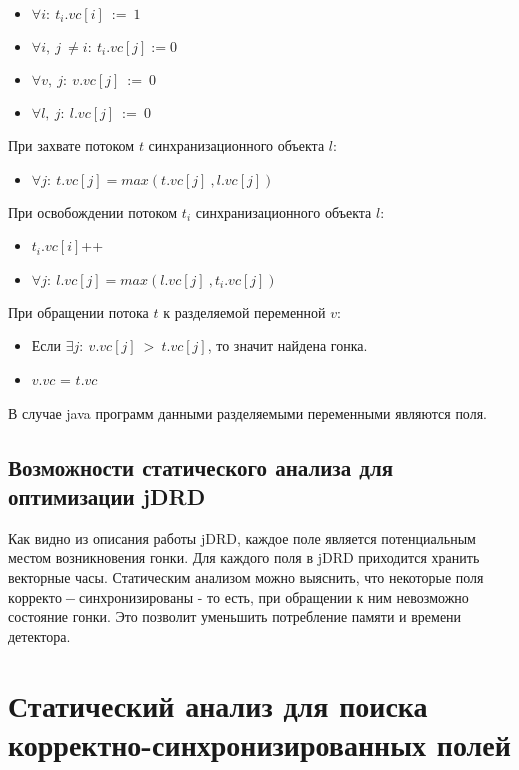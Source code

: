 \begin{itemize}
	\item $ \forall i:\ t_i.vc[i]\ :=\ 1$
	\item $ \forall i,\ j\ \neq i:\ t_i.vc[j] := 0$
	\item $ \forall v,\ j:\  v.vc[j]\ :=\ 0$
	\item $ \forall l,\ j:\  l.vc[j]\ :=\ 0$
\end{itemize}
При захвате потоком $t$ синхранизационного объекта $l$: 

\begin{itemize}
	\item $ \forall j:\ t.vc[j] = max(t.vc[j]\ , l.vc[j])$
\end{itemize}
При освобождении потоком $t_i$ синхранизационного объекта $l$: 

\begin{itemize}
	\item $t_i.vc[i]$++
	\item $ \forall j:\ l.vc[j] = max(l.vc[j]\ , t_i.vc[j])$
\end{itemize}
При обращении потока $t$ к разделяемой переменной $v$: 
\begin{itemize}
	\item Если $ \exists j:\ v.vc[j]\ >\ t.vc[j]$, то значит найдена гонка. 
	\item $v.vc$ = $t.vc$
\end{itemize}


В случае java программ данными разделяемыми переменными являются поля. 


\subsection{Возможности статического анализа для оптимизации jDRD}
Как видно из описания работы jDRD, каждое поле является потенциальным местом возникновения гонки.  
Для каждого поля в jDRD приходится хранить векторные часы. Статическим анализом можно выяснить, что некоторые поля $корректо-синхронизированы$ - то есть, при обращении к ним невозможно состояние гонки. Это позволит уменьшить потребление памяти и времени детектора. 

\section{Статический анализ для поиска корректно-синхронизированных полей}

